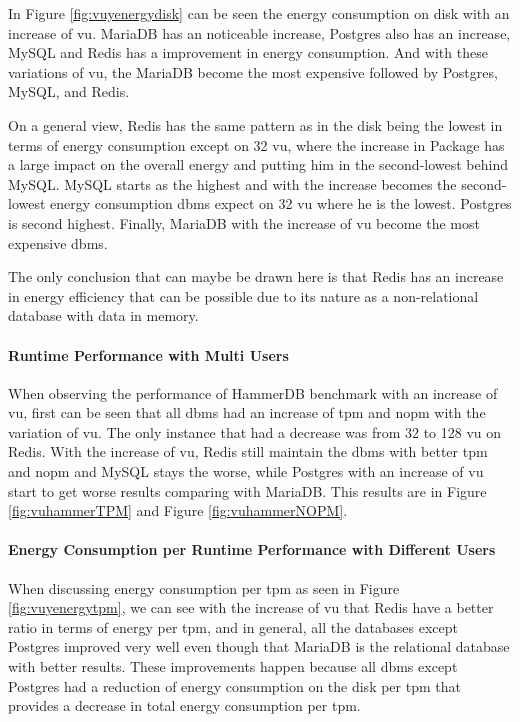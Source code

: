     In Figure \ref{fig:vuyenergydisk} can be seen the energy consumption on disk with an increase of \gls{vu}. MariaDB has an noticeable increase, Postgres also has an increase, MySQL and Redis has a improvement in energy consumption. And with these variations of \gls{vu}, the MariaDB become the most expensive followed by Postgres, MySQL, and Redis.
    
    On a general view, Redis has the same pattern as in the disk being the lowest in terms of energy consumption except on 32 \gls{vu}, where the increase in Package has a large impact on the overall energy and putting him in the second-lowest behind MySQL. MySQL  starts as the highest and with the increase becomes the second-lowest energy consumption \gls{dbms} expect on 32 \gls{vu} where he is the lowest. Postgres is second highest. Finally, MariaDB with the increase of \gls{vu} become the most expensive \gls{dbms}.
    
    The only conclusion that can maybe be drawn here is that Redis has an increase in energy efficiency that can be possible due to its nature as a non-relational database with data in memory.




\paragraph{Runtime Performance with Multi Users}

    When observing the performance of HammerDB benchmark with an increase of \gls{vu}, first can be seen that all \gls{dbms} had an increase of \gls{tpm} and \gls{nopm} with the variation of \gls{vu}. The only instance that had a decrease was from 32 to 128 \gls{vu} on Redis. With the increase of \gls{vu}, Redis still maintain the \gls{dbms} with better \gls{tpm} and \gls{nopm} and MySQL stays the worse, while Postgres with an increase of \gls{vu} start to get worse results comparing with MariaDB. This results are in Figure \ref{fig:vuhammerTPM} and Figure \ref{fig:vuhammerNOPM}.
    

    



\paragraph{Energy Consumption per Runtime Performance with Different Users}

    When discussing energy consumption per \gls{tpm} as seen in Figure \ref{fig:vuyenergytpm}, we can see with the increase of \gls{vu} that Redis have a better ratio in terms of energy per \gls{tpm}, and in general, all the databases except Postgres improved very well even though that MariaDB is the relational database with better results. These improvements happen because all \gls{dbms} except Postgres had a reduction of energy consumption on the disk per \gls{tpm} that provides a decrease in total energy consumption per \gls{tpm}. 
    
